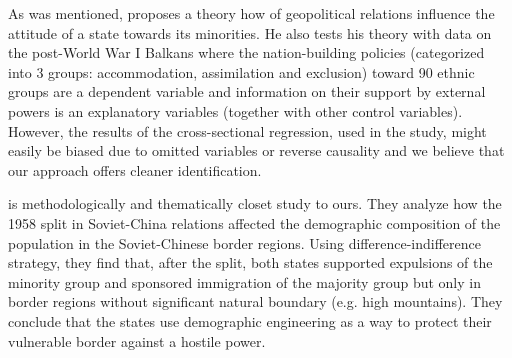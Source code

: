 As was mentioned, \citet{mylonas_politics_2013} proposes a theory how of geopolitical relations influence the attitude of a state towards its minorities. He also tests his theory with data on the post-World War I Balkans where the nation-building policies (categorized into 3 groups: accommodation, assimilation and exclusion)  toward  90 ethnic groups are a dependent variable and information on their support by external powers is an explanatory variables (together with other control variables). However, the results of the cross-sectional regression, used in the study, might easily be biased due to omitted variables or reverse causality and we believe that our approach offers cleaner identification.


\citet{mcnamee_demographic_nodate} is methodologically and thematically closet study to ours. They analyze how the 1958 split in Soviet-China relations affected the demographic composition of the population in the Soviet-Chinese border regions.
Using difference-indifference strategy, they find that, after the split,  both states supported expulsions  of the minority group and sponsored immigration of the majority group but only in border regions without significant natural boundary (e.g. high mountains). They conclude that the states use demographic engineering as a way to protect their vulnerable border against a hostile power. 


